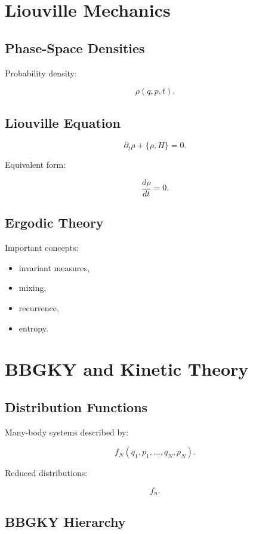 \documentclass[11pt]{book}
\begin{document}
\chapter{Liouville Mechanics}

\section{Phase-Space Densities}

Probability density:

\[
\rho(q,p,t).
\]

\section{Liouville Equation}

\[
\partial_t\rho
+
\{\rho,H\}
=0.
\]

Equivalent form:

\[
\frac{d\rho}{dt}=0.
\]

\section{Ergodic Theory}

Important concepts:

\begin{itemize}
\item invariant measures,
\item mixing,
\item recurrence,
\item entropy.
\end{itemize}

\chapter{BBGKY and Kinetic Theory}

\section{Distribution Functions}

Many-body systems described by:

\[
f_N(q_1,p_1,\dots,q_N,p_N).
\]

Reduced distributions:

\[
f_n.
\]

\section{BBGKY Hierarchy}
\end{document}
